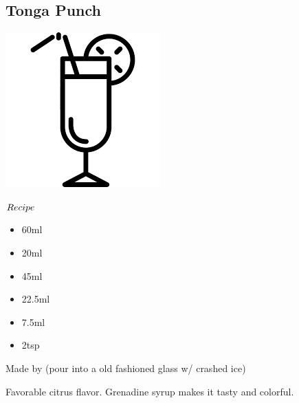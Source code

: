 \subsection{Tonga Punch}
\vspace{-7.5mm}
\hspace{38mm}
\includegraphics[scale=.07]{cocktail_glass_tall.png}
\vspace{2.5mm}
\begin{itembox}[l]{\boldmath $Recipe$}
\begin{itemize}
\setlength{\parskip}{0cm}
\setlength{\itemsep}{0cm}
\item \rum 60ml
\item \oc 20ml
\item \oj 45ml
\item \lj 22.5ml
\item \limj 7.5ml
\item \gs 2tsp
\end{itemize}
\vspace{-4mm}
Made by \shake (pour into a old fashioned glass w/ crashed ice)
\end{itembox}
Favorable citrus flavor. Grenadine syrup makes it tasty and colorful.
